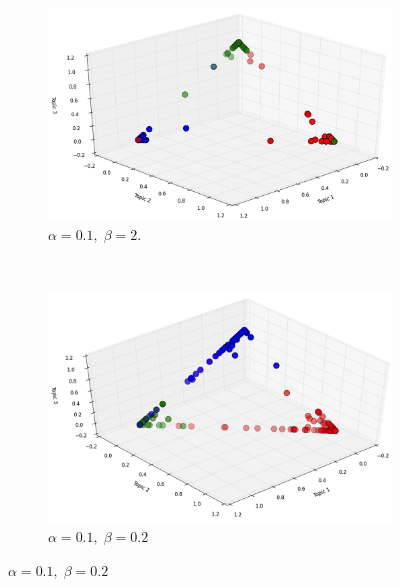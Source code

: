 \documentclass[twoside,12pt]{article}
\begin{document}
\begin{figure}[h!]
        \centering
        \begin{subfigure}[b]{0.5\textwidth}
                \includegraphics[width=\textwidth]{figs/classicalpha01beta2.png}
                \caption{$\alpha=0.1,\;\beta=2.$}
                \label{fig:gull}
        \end{subfigure}%
        ~ %
        \begin{subfigure}[b]{0.5\textwidth}
                \includegraphics[width=\textwidth]{figs/classicalpha01beta02.png}
                \caption{$\alpha=0.1,\;\beta=0.2$}
                \label{fig:tiger}
        \end{subfigure}
        

\end{figure}
\end{document}
